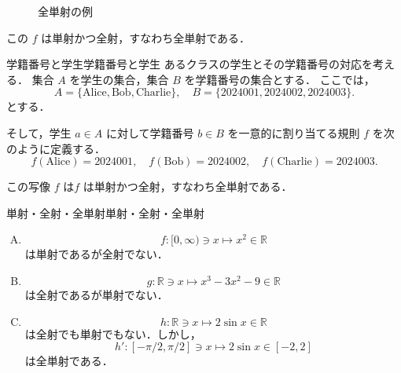 \documentclass[a4paper,11pt]{ltjsarticle}
\begin{document}
\begin{figure}[ht]
  \centering
  \caption{全単射の例}
\end{figure}

この $f$ は単射かつ全射，すなわち全単射である．

\begin{example}{学籍番号と学生}{学籍番号と学生}
  あるクラスの学生とその学籍番号の対応を考える．
  集合 $A$ を学生の集合，集合 $B$ を学籍番号の集合とする．
  ここでは，
  \[
  A = \{\text{Alice}, \text{Bob}, \text{Charlie}\}, \quad
  B = \{\text{2024001}, \text{2024002}, \text{2024003}\}.
  \]
  とする．

  そして，学生 $a \in A$ に対して学籍番号 $b \in B$ を一意的に割り当てる規則 $f$ を次のように定義する．
  \[
  f(\text{Alice}) = \text{2024001}, \quad
  f(\text{Bob}) = \text{2024002}, \quad
  f(\text{Charlie}) = \text{2024003}.
  \]
  
  この写像 $f$ は$f$ は単射かつ全射，すなわち全単射である．
\end{example}

\begin{example}{単射・全射・全単射}{単射・全射・全単射}
  \begin{enumerate}[(A)]
    \item 
  \[
  f \colon [0,\infty) \ni x \mapsto x^2  \in \mathbb{R}
  \]
  は単射であるが全射でない．
  \item 
\[ 
g \colon \mathbb{R} \ni x \mapsto x^3 -3x^2 -9 \in \mathbb{R}
\]
は全射であるが単射でない．
\item 
\[ 
h  \colon \mathbb{R} \ni x \mapsto  2 \sin x \in  \mathbb{R} 
\]
は全射でも単射でもない．しかし，
\[ 
h'  \colon [-\pi/2 , \pi/2 ]  \ni x \mapsto  2 \sin  x  \in [-2,2]
\]
は全単射である．
  \end{enumerate}
\end{example}
\clearpage 
\end{document}
